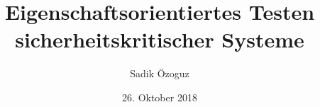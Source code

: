 \documentclass[10pt]{beamer}
\title{Eigenschaftsorientiertes Testen sicherheitskritischer Systeme}
\author{Sadik Özoguz}
\institute{Universit{\"a}t Bremen}
\date[26.10.2018]{26. Oktober 2018}
\begin{document}
\begin{frame}
  \titlepage
\end{frame}

\begin{frame}
  \tableofcontents
\end{frame}








\end{document}
